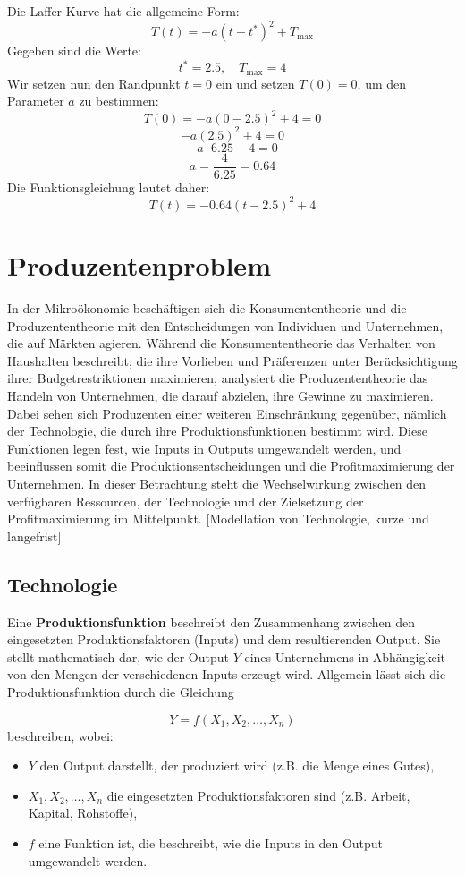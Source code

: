 \begin{example}
	Die Laffer-Kurve hat die allgemeine Form:
	\[
		T(t) = -a(t - t^*)^2 + T_{\text{max}}
	\]
	Gegeben sind die Werte:
	\[
		t^* = 2.5, \quad T_{\text{max}} = 4
	\]
	Wir setzen nun den Randpunkt $t = 0$ ein und setzen $T(0) = 0$, um den Parameter $a$ zu bestimmen:
	\[
		T(0) = -a(0 - 2.5)^2 + 4 = 0
	\]
	\[
		-a(2.5)^2 + 4 = 0
	\]
	\[
		-a \cdot 6.25 + 4 = 0
	\]
	\[
		a = \frac{4}{6.25} = 0.64
	\]
	Die Funktionsgleichung lautet daher:
	\[
		T(t) = -0.64(t - 2.5)^2 + 4
	\]

\end{example}


\section{Produzentenproblem}
In der Mikroökonomie beschäftigen sich die Konsumententheorie und die Produzententheorie mit den Entscheidungen von Individuen und Unternehmen, die auf Märkten agieren. Während die Konsumententheorie das Verhalten von Haushalten beschreibt, die ihre Vorlieben und Präferenzen unter Berücksichtigung ihrer Budgetrestriktionen maximieren, analysiert die Produzententheorie das Handeln von Unternehmen, die darauf abzielen, ihre Gewinne zu maximieren. Dabei sehen sich Produzenten einer weiteren Einschränkung gegenüber, nämlich der Technologie, die durch ihre Produktionsfunktionen bestimmt wird. Diese Funktionen legen fest, wie Inputs in Outputs umgewandelt werden, und beeinflussen somit die Produktionsentscheidungen und die Profitmaximierung der Unternehmen. In dieser Betrachtung steht die Wechselwirkung zwischen den verfügbaren Ressourcen, der Technologie und der Zielsetzung der Profitmaximierung im Mittelpunkt.
[Modellation von Technologie, kurze und langefrist]
\subsection{Technologie}
\begin{definition} 
	Eine \textbf{Produktionsfunktion} beschreibt den Zusammenhang zwischen den eingesetzten Produktionsfaktoren (Inputs) und dem resultierenden Output. Sie stellt mathematisch dar, wie der Output \( Y \) eines Unternehmens in Abhängigkeit von den Mengen der verschiedenen Inputs erzeugt wird.
	Allgemein lässt sich die Produktionsfunktion durch die Gleichung

	\[
		Y = f(X_1, X_2, \dots, X_n)
	\]
	beschreiben, wobei:
	\begin{itemize}
		\item \( Y \) den Output darstellt, der produziert wird (z.B. die Menge eines Gutes),
		\item \( X_1, X_2, \dots, X_n \) die eingesetzten Produktionsfaktoren sind (z.B. Arbeit, Kapital, Rohstoffe),
		\item \( f \) eine Funktion ist, die beschreibt, wie die Inputs in den Output umgewandelt werden.
	\end{itemize}
\end{definition}

